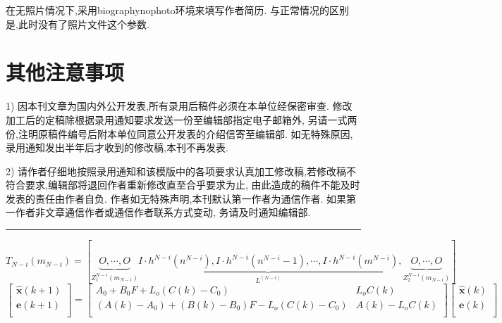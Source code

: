 \documentclass{aas}
\begin{document}
\begin{multicols}{2}
在无照片情况下,采用biographynophoto环境来填写作者简历.
与正常情况的区别是,此时没有了照片文件这个参数.

\section{其他注意事项}

1) 因本刊文章为国内外公开发表,所有录用后稿件必须在本单位经保密审查.
修改加工后的定稿除根据录用通知要求发送一份至编辑部指定电子邮箱外,
另请一式两份,注明原稿件编号后附本单位同意公开发表的介绍信寄至编辑部.
如无特殊原因,录用通知发出半年后才收到的修改稿,本刊不再发表.

2)
请作者仔细地按照录用通知和该模版中的各项要求认真加工修改稿,若修改稿不符合要求,编辑部将退回作者重新修改直至合乎要求为止,
由此造成的稿件不能及时发表的责任由作者自负.
作者如无特殊声明,本刊默认第一作者为通信作者.
如果第一作者非文章通信作者或通信作者联系方式变动,
务请及时通知编辑部.


\end{multicols}%
\vskip1mm
\hrule
\begin{equation}
T_{N-i}(m_{N-i})= \left[ \underbrace{O,\cdots,
O}_{Z_1^{N-i}(m_{N-i})} \underbrace{I \cdot h^{N-i}(n^{N-i}), I
\cdot h^{N-i}(n^{N-i}-1),\cdots, I \cdot
h^{N-i}(m^{N-i})}_{L^{(N-i)}},\underbrace{O,\cdots,
O}_{Z_2^{N-i}(m_{N-i})} \right]\tag{3}
\end{equation}
\begin{equation} \left[
  \begin{array}{c}
    \hat{{\pmb x}}(k+1) \\
    {\pmb e}(k+1)\\
  \end{array}
\right]=\left[
  \begin{array}{cc}
    A_0+B_0F+L_o(C(k)-C_0) & L_oC(k) \\
    (A(k)-A_0)+(B(k)-B_0)F-L_o(C(k)-C_0) & A(k)-L_oC(k) \\
  \end{array}
\right]\left[
  \begin{array}{c}
    \hat{{\pmb x}}(k) \\
    {\pmb e} (k)\\
  \end{array}
\right]\tag{4}
\end{equation}
\begin{multicols}{2}%

\end{multicols}%
\end{document}
